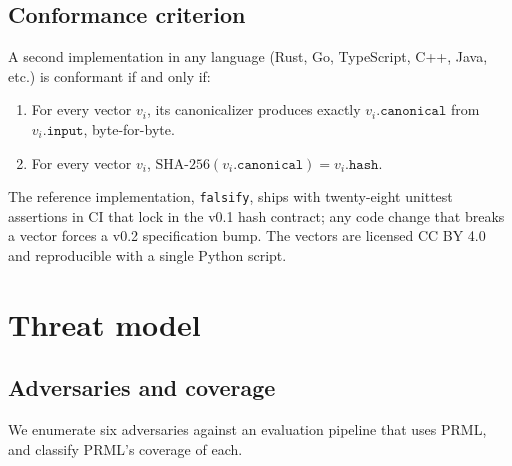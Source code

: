 \documentclass[11pt, a4paper]{article}
\begin{document}
\subsection{Conformance criterion}

A second implementation in any language (Rust, Go, TypeScript, C++, Java, etc.) is conformant if and only if:

\begin{enumerate}[leftmargin=2em, itemsep=0.2em]
  \item For every vector $v_i$, its canonicalizer produces exactly $v_i.\texttt{canonical}$ from $v_i.\texttt{input}$, byte-for-byte.
  \item For every vector $v_i$, $\mathrm{SHA\text{-}256}(v_i.\texttt{canonical}) = v_i.\texttt{hash}$.
\end{enumerate}

The reference implementation, \texttt{falsify}, ships with twenty-eight unittest assertions in CI that lock in the v0.1 hash contract; any code change that breaks a vector forces a v0.2 specification bump. The vectors are licensed CC BY 4.0 and reproducible with a single Python script.

\section{Threat model}
\label{sec:threat}

\subsection{Adversaries and coverage}

We enumerate six adversaries against an evaluation pipeline that uses PRML, and classify PRML's coverage of each.
\end{document}
